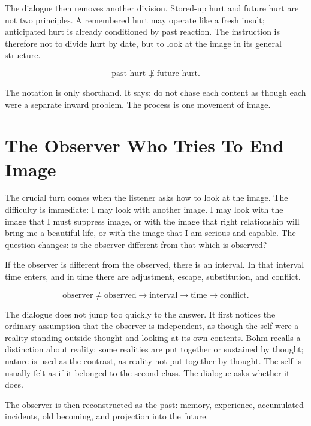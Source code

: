 \documentclass[11pt,oneside]{book}
\begin{document}
The dialogue then removes another division. Stored-up hurt and future hurt are not two principles. A remembered hurt may operate like a fresh insult; anticipated hurt is already conditioned by past reaction. The instruction is therefore not to divide hurt by date, but to look at the image in its general structure.

\begin{equation}
\text{past hurt}
\not\perp
\text{future hurt}.
\end{equation}

The notation is only shorthand. It says: do not chase each content as though each were a separate inward problem. The process is one movement of image.

\section{The Observer Who Tries To End Image}

The crucial turn comes when the listener asks how to look at the image. The difficulty is immediate: I may look with another image. I may look with the image that I must suppress image, or with the image that right relationship will bring me a beautiful life, or with the image that I am serious and capable. The question changes: is the observer different from that which is observed?

If the observer is different from the observed, there is an interval. In that interval time enters, and in time there are adjustment, escape, substitution, and conflict.

\begin{equation}
\text{observer} \neq \text{observed}
\longrightarrow
\text{interval}
\longrightarrow
\text{time}
\longrightarrow
\text{conflict}.
\end{equation}

The dialogue does not jump too quickly to the answer. It first notices the ordinary assumption that the observer is independent, as though the self were a reality standing outside thought and looking at its own contents. Bohm recalls a distinction about reality: some realities are put together or sustained by thought; nature is used as the contrast, as reality not put together by thought. The self is usually felt as if it belonged to the second class. The dialogue asks whether it does.

The observer is then reconstructed as the past: memory, experience, accumulated incidents, old becoming, and projection into the future.
\end{document}
